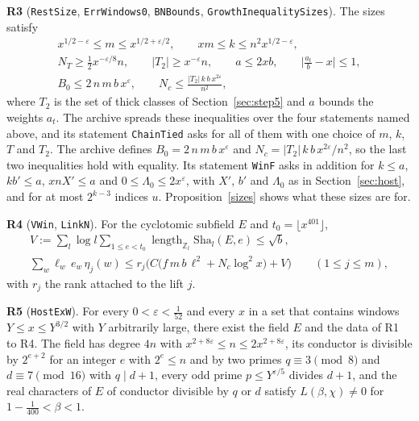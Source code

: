 \documentclass[11pt,letterpaper]{article}
\numberwithin{equation}{section}
\newcommand{\Sha}{\mathrm{Sha}}
\begin{document}
\noindent\textbf{R3} (\texttt{RestSize}, \texttt{ErrWindows0}, \texttt{BNBounds}, \texttt{GrowthInequalitySizes}). The sizes satisfy
\begin{gather*}
x^{1/2-\varepsilon}\le m\le x^{1/2+\varepsilon/2},\qquad xm\le k\le n^2x^{1/2-\varepsilon},\\
N_T\ge\tfrac12x^{-\varepsilon/8}n,\qquad|T_2|\ge x^{-\varepsilon}n,\qquad a\le2xb,\qquad\Big|\frac{a_t}{b}-x\Big|\le1,\\
B_0\le2\,n\,m\,b\,x^{\varepsilon},\qquad N_c\le\frac{|T_2|\,k\,b\,x^{2\varepsilon}}{n^2} ,
\end{gather*}
where $T_2$ is the set of thick classes of Section~\ref{sec:step5} and $a$ bounds the weights $a_t$. The archive spreads these inequalities over the four statements named above, and its statement \texttt{ChainTied} asks for all of them with one choice of $m$, $k$, $T$ and $T_2$. The archive defines $B_0=2\,n\,m\,b\,x^{\varepsilon}$ and $N_c=|T_2|\,k\,b\,x^{2\varepsilon}/n^2$, so the last two inequalities hold with equality. Its statement \texttt{WinF} asks in addition for $k\le a$, $kb'\le a$, $xnX'\le a$ and $0\le\Lambda_0\le2x^{\varepsilon}$, with $X'$, $b'$ and $\Lambda_0$ as in Section~\ref{sec:host}, and for at most $2^{k-3}$ indices $u$. Proposition~\ref{sizes} shows what these sizes are for.

\noindent\textbf{R4} (\texttt{VWin}, \texttt{LinkN}). For the cyclotomic subfield $E$ and $t_0=\lfloor x^{401}\rfloor$,
\begin{gather*}
V:=\sum_{l}\log l\sum_{1\le e<t_0}\operatorname{length}_{\mathbb Z_l}\Sha_l(E,e)\le\sqrt b,\\
\sum_w\ell_w\,e_w\,\eta_j(w)\le r_j\Big(C\big(f\,m\,b\,\ell^2+N_c\log^2x\big)+V\Big)\qquad(1\le j\le m),
\end{gather*}
with $r_j$ the rank attached to the lift $j$.

\noindent\textbf{R5} (\texttt{HostExW}). For every $0<\varepsilon<\tfrac1{52}$ and every $x$ in a set that contains windows $Y\le x\le Y^{3/2}$ with $Y$ arbitrarily large, there exist the field $E$ and the data of R1 to R4. The field has degree $4n$ with $x^{2+8\varepsilon}\le n\le2x^{2+8\varepsilon}$, its conductor is divisible by $2^{e+2}$ for an integer $e$ with $2^e\le n$ and by two primes $q\equiv3\pmod8$ and $d\equiv7\pmod{16}$ with $q\mid d+1$, every odd prime $p\le Y^{\varepsilon/5}$ divides $d+1$, and the real characters of $E$ of conductor divisible by $q$ or $d$ satisfy $L(\beta,\chi)\ne0$ for $1-\tfrac1{400}<\beta<1$.
\end{document}
